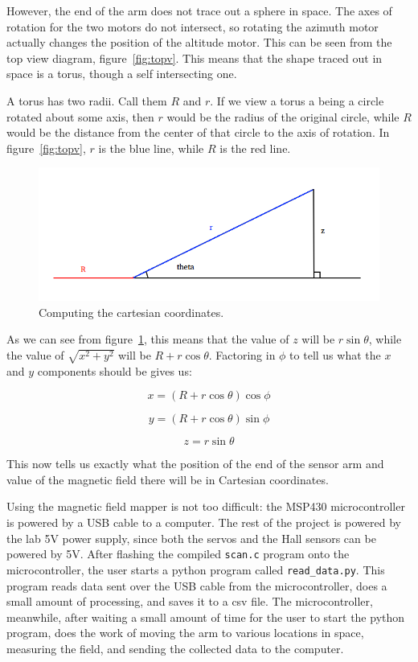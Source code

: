 \documentclass[]{article}
\begin{document}
However, the end of the arm does not trace out a sphere in space. The axes of rotation for the two motors do not intersect, so rotating the azimuth motor actually changes the position of the altitude motor. This can be seen from the top view diagram, figure~\ref{fig:topv}. This means that the shape traced out in space is a torus, though a self intersecting one.

A torus has two radii. Call them $R$ and $r$. If we view a torus a being a circle rotated about some axis, then $r$ would be the radius of the original circle, while $R$ would be the distance from the center of that circle to the axis of rotation. In figure~\ref{fig:topv}, $r$ is the  blue line, while $R$ is the red line.

\begin{figure}
\begin{center}
\caption{Computing the cartesian coordinates. \label{fig:trig}}
\includegraphics[width=.9\linewidth]{triangle}
\end{center}
\end{figure}

As we can see from figure~\ref{fig:trig}, this means that the value of $z$ will be $r \sin \theta$, while the value of $\sqrt{x^2+y^2}$ will be $R + r\cos\theta$. Factoring in $\phi$ to tell us what the $x$ and $y$ components should be gives us:

$$
x = (R + r\cos\theta)\cos \phi
$$

$$
y = (R + r\cos\theta)\sin \phi
$$

$$
z = r\sin\theta
$$

This now tells us exactly what the position of the end of the sensor arm and value of the magnetic field there will be in Cartesian coordinates.

Using the magnetic field mapper is not too difficult: the MSP430 microcontroller is powered by a USB cable to a computer. The rest of the project is powered by the lab 5V power supply, since both the servos and the Hall sensors can be powered  by 5V. After flashing the compiled {\tt scan.c} program onto the microcontroller, the user starts a python program called {\tt read\_data.py}. This program reads data sent over the USB cable from the microcontroller, does a small amount of processing, and saves it to a csv file. The microcontroller, meanwhile, after waiting a small amount of time for the user to start the python program, does the work of moving the arm to various locations in space, measuring the field, and sending the collected data to the computer.
\end{document}
